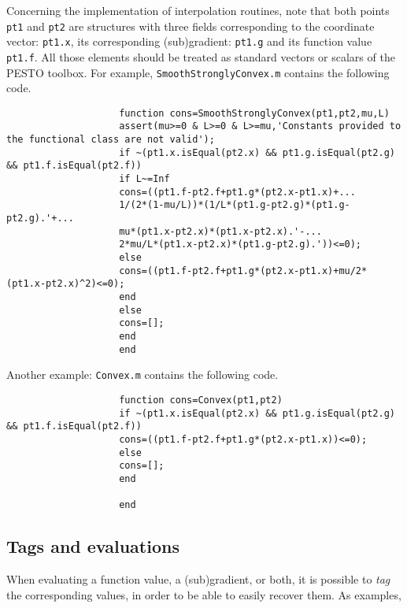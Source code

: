 \documentclass[11pt,a4paper]{article}
\begin{document}
					Concerning the implementation of interpolation routines, note that both points \verb?pt1? and \verb?pt2? are structures with three fields corresponding to the coordinate vector: \verb?pt1.x?, its corresponding (sub)gradient: \verb?pt1.g? and its function value \verb?pt1.f?. All those elements should be treated as standard vectors or scalars of the PESTO toolbox. For example, \verb?SmoothStronglyConvex.m? contains the following code.\\[-1cm]
					
					\begin{lstlisting}
					function cons=SmoothStronglyConvex(pt1,pt2,mu,L)
					assert(mu>=0 & L>=0 & L>=mu,'Constants provided to the functional class are not valid');
					if ~(pt1.x.isEqual(pt2.x) && pt1.g.isEqual(pt2.g) && pt1.f.isEqual(pt2.f))
					if L~=Inf
					cons=((pt1.f-pt2.f+pt1.g*(pt2.x-pt1.x)+...
					1/(2*(1-mu/L))*(1/L*(pt1.g-pt2.g)*(pt1.g-pt2.g).'+...
					mu*(pt1.x-pt2.x)*(pt1.x-pt2.x).'-...
					2*mu/L*(pt1.x-pt2.x)*(pt1.g-pt2.g).'))<=0);
					else
					cons=((pt1.f-pt2.f+pt1.g*(pt2.x-pt1.x)+mu/2*(pt1.x-pt2.x)^2)<=0);
					end    
					else
					cons=[];
					end
					end
					\end{lstlisting}
					\newpage
					Another example: \verb?Convex.m? contains the following code.\\[-1cm]
					\begin{lstlisting}
					function cons=Convex(pt1,pt2)
					if ~(pt1.x.isEqual(pt2.x) && pt1.g.isEqual(pt2.g) && pt1.f.isEqual(pt2.f))
					cons=((pt1.f-pt2.f+pt1.g*(pt2.x-pt1.x))<=0);
					else
					cons=[];
					end
					
					end
					\end{lstlisting}
					\newpage
					\subsection{Tags and evaluations}\label{sec:tags}
					When evaluating a function value, a (sub)gradient, or both, it is possible to \emph{tag} the corresponding values, in order to be able to easily recover them. As examples,
					
\end{document}
